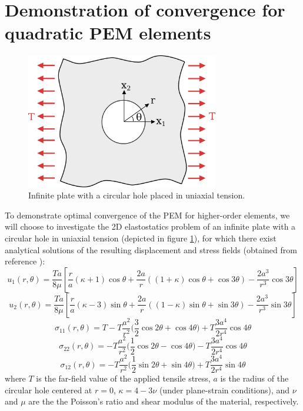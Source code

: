\documentclass[12pt]{article}
\begin{document}
\section*{Demonstration of convergence for quadratic PEM elements}

\begin{figure}[!h]
  \centering
  \includegraphics[width=0.75\textwidth]{plate_with_hole.png}
  \caption{Infinite plate with a circular hole placed in uniaxial tension.}
  \label{fig:plate_with_hole_problem}
\end{figure}
To demonstrate optimal convergence of the PEM for higher-order elements, we will choose to investigate the 2D elastostatics problem of an infinite plate with a circular hole in uniaxial tension (depicted in figure \ref{fig:plate_with_hole_problem}), for which there exist analytical solutions of the resulting displacement and stress fields (obtained from reference \cite{plate_with_hole_exact_solution}):
\begin{equation}
  u_1 (r,\theta) = \frac{Ta}{8\mu} \left[ \frac{r}{a} (\kappa + 1) \cos \theta + \frac{2a}{r} ((1+\kappa) \cos \theta + \cos 3 \theta) - \frac{2a^3}{r^3} \cos 3 \theta \right]
\end{equation}
\begin{equation}
  u_2 (r,\theta) = \frac{Ta}{8\mu} \left[ \frac{r}{a} (\kappa - 3) \sin \theta + \frac{2a}{r} ((1-\kappa) \sin \theta + \sin 3 \theta) - \frac{2a^3}{r^3} \sin 3 \theta \right]
\end{equation}
\begin{equation}
  \sigma_{11} (r, \theta) = T - T \frac{a^2}{r^2} \bigg( \frac{3}{2} \cos 2 \theta + \cos 4 \theta \bigg) + T \frac{3a^4}{2r^4} \cos 4 \theta
\end{equation}
\begin{equation}
  \sigma_{22} (r, \theta) = - T \frac{a^2}{r^2} \bigg( \frac{1}{2} \cos 2 \theta - \cos 4 \theta \bigg) - T \frac{3a^4}{2r^4} \cos 4 \theta
\end{equation}
\begin{equation}
  \sigma_{12} (r, \theta) = - T \frac{a^2}{r^2} \bigg( \frac{1}{2} \sin 2 \theta + \sin 4 \theta \bigg) + T \frac{3a^4}{2r^4} \sin 4 \theta
\end{equation}
where $T$ is the far-field value of the applied tensile stress, $a$ is the radius of the circular hole centered at $r=0$, $\kappa = 4 - 3\nu$ (under plane-strain conditions), and $\nu$ and $\mu$ are the the Poisson's ratio and shear modulus of the material, respectively.
\end{document}
